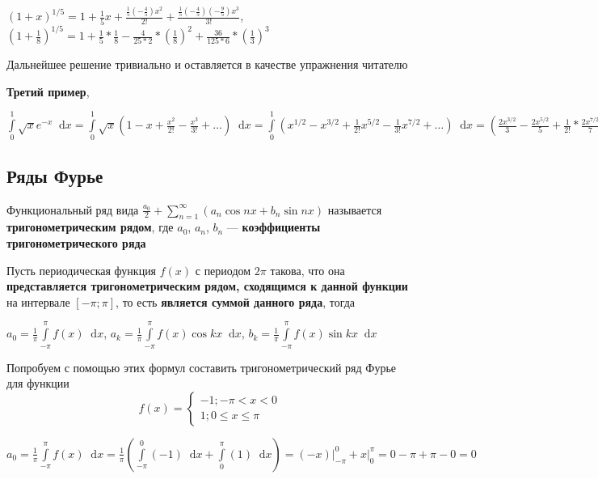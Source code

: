 \documentclass{article}
\newcommand*\diff{\mathop{}\!\mathrm{d}}
\begin{document}
$(1 + x)^{1/5} = 1 + \frac{1}{5} x + \frac{\frac{1}{5} (-\frac{4}{5}) x^2}{2!} + \frac{\frac{1}{5} (-\frac{4}{5}) (-\frac{9}{5}) x^3}{3!}$, $(1 + \frac{1}{8})^{1/5} = 1 + \frac{1}{5} * \frac{1}{8} - \frac{4}{25 * 2} * (\frac{1}{8})^2 + \frac{36}{125 * 6} * (\frac{1}{3})^3$

Дальнейшее решение тривиально и оставляется в качестве упражнения читателю

\hfill

\textbf{Третий пример},

$\int\limits_{0}^{1} \sqrt{x} e^{-x} \diff x = \int\limits_{0}^{1} \sqrt{x} (1 - x + \frac{x^2}{2!} - \frac{x^3}{3!} + \dots) \diff x = \int\limits_{0}^{1} (x^{1/2} - x^{3/2} + \frac{1}{2!} x^{5/2} - \frac{1}{3!} x^{7/2} + \dots) \diff x = ( \frac{2 x^{3/2}}{3} - \frac{2x^{5/2}}{5} + \frac{1}{2!} * \frac{2 x^{7/2}}{7} - \frac{1}{3!} * \frac{2 x^{9/2}}{9} + \dots) \bigg|_{0}^{1} = \frac{2}{3} - \frac{2}{5} + \frac{1}{7} - \frac{1}{54} + \dots$

\subsection{Ряды Фурье}

Функциональный ряд вида $\frac{a_0}{2} + \sum\limits_{n = 1}^{\infty} (a_{n} \cos n x + b_{n} \sin n x) $ называется \textbf{тригонометрическим рядом}, где $a_0$, $a_{n}$, $b_{n}$ — \textbf{коэффициенты тригонометрического ряда}

\hfill

Пусть периодическая функция $f(x)$ с периодом $2 \pi$ такова, что она \textbf{представляется тригонометрическим рядом, сходящимся к данной функции} на интервале $[-\pi; \pi]$, то есть \textbf{является суммой данного ряда}, тогда

$a_0 = \frac{1}{\pi} \int\limits_{-\pi}^{\pi} f(x) \diff x$, $a_{k} = \frac{1}{\pi} \int\limits_{-\pi}^{\pi} f(x) \cos k x \diff x$, $b_{k} = \frac{1}{\pi} \int\limits_{-\pi}^{\pi} f(x) \sin k x \diff x$

\hfill

Попробуем с помощью этих формул составить тригонометрический ряд Фурье для функции $$f(x) = \begin{cases}
    -1; - \pi < x < 0 \\
    1; 0 \le x \le \pi
\end{cases}$$

$a_0 = \frac{1}{\pi} \int\limits_{-\pi}^{\pi} f(x) \diff x = \frac{1}{\pi} (\int\limits_{-\pi}^{0} (-1) \diff x + \int\limits_{0}^{\pi} (1) \diff x) = (-x) \bigg|_{-\pi}^{0} + x \bigg|_{0}^{\pi} = 0 - \pi + \pi - 0 = 0$
\end{document}
